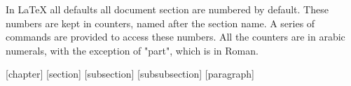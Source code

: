 

\quad 
In LaTeX all defaults all document section are numbered by default. These numbers are kept in counters, named after the section name. A series of commands are provided to access these numbers.
All the counters are in arabic numerals, with the exception of "part", which is in Roman.


\begin{teX}
\newcommand*\chaptermark[1]{}
\setcounter{secnumdepth}{2}
[chapter]
[section]
[subsection]
[subsubsection]
[paragraph]
\renewcommand \thepart {\@Roman\c@part}
\renewcommand \thechapter {\@arabic\c@chapter}
\renewcommand \thesection {\thechapter.\@arabic\c@section}
\renewcommand\thesubsection   {\thesection.\@arabic\c@subsection}
\renewcommand\thesubsubsection{\thesubsection.\@arabic\c@subsubsection}
\renewcommand\theparagraph    {\thesubsubsection.\@arabic\c@paragraph}
\renewcommand\thesubparagraph {\theparagraph.\@arabic\c@subparagraph}
\newcommand\@chapapp{\chaptername}
\end{teX}


